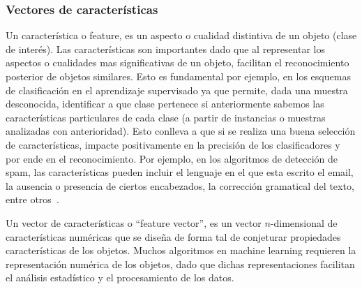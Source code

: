 \subsubsection{Vectores de características} \label{subsec:feature}

	Un característica o feature, es un aspecto o cualidad distintiva de un objeto (clase de interés). Las características son importantes dado que al representar los aspectos o cualidades mas significativas de un objeto, facilitan el reconocimiento posterior de objetos similares. Esto es fundamental por ejemplo, en los esquemas de clasificación en el aprendizaje supervisado ya que permite, dada una muestra desconocida, identificar a que clase pertenece si anteriormente sabemos las características particulares de cada clase (a partir de instancias o muestras analizadas con anterioridad). Esto conlleva a que si se realiza una buena selección de características, impacte positivamente en la precisión de los clasificadores y por ende en el reconocimiento. Por ejemplo, en los algoritmos de detección de spam, las características pueden incluir el lenguaje en el que esta escrito el email, la ausencia o presencia de ciertos encabezados, la corrección gramatical del texto, entre otros~\cite{SpamPaper}.

	Un vector de características o ``feature vector'', es un  vector $n$-dimensional de características numéricas que se diseña de forma tal de conjeturar propiedades características de los objetos. Muchos algoritmos en machine learning requieren la representación numérica de los objetos, dado que dichas representaciones facilitan el análisis estadístico y el procesamiento de los datos.
		
	
		
	
